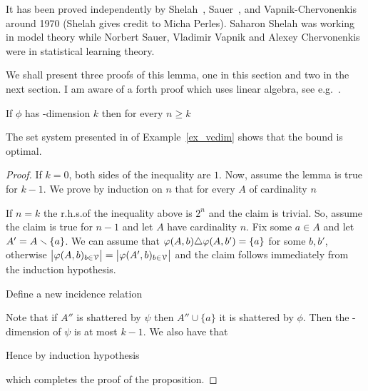 \documentclass[sputnik.tex]{subfiles}
\begin{document}
It has been proved independently by Shelah~\cite{shelah72}, Sauer~\cite{sauer}, and Vapnik-Cher\-vo\-nen\-kis~\cite{VC} around 1970 (Shelah gives credit to Micha Perles).
Saharon Shelah was working in model theory while Norbert Sauer, Vladimir Vapnik and Alexey Chervonenkis were in statistical learning theory.

We shall present three proofs of this lemma, one in this section and two in the next section. I am aware of a forth proof which uses linear algebra, see e.g.~\cite{gowers}. 

\begin{proposition}\label{prop_Sauer}
If $\phi$ has \vc-dimension $k$ then for every $n\ge k$

\end{proposition}

The set system presented in  of Example~\ref{ex_vcdim} shows that the bound is optimal.

\begin{proof}
If $k=0$, both sides of the inequality are $1$.
Now, assume the lemma is true for $k-1$.
We prove by induction on $n$ that for every $A$ of cardinality $n$


If $n=k$ the r.h.s.\@ of the inequality above is $2^n$ and the claim is trivial.
So, assume the claim is true for $n-1$ and let $A$ have cardinality $n$.
Fix some $a\in A$ and let $A'=A\smallsetminus\{a\}$.
We can assume that $\varphi(A,b)\triangle\varphi(A,b')=\{a\}$ for some $b,b'$, otherwise $\big|\varphi(A,b)_{b\in\EuScript V}\big|=\big|\varphi(A',b)_{b\in\EuScript V}\big|$ and the claim follows immediately from the induction hypothesis.

Define a new incidence relation



Note that if $A''$ is shattered by $\psi$ then $A''\cup\{a\}$ it is shattered by $\phi$.
Then the \vc-dimension of $\psi$ is at most $k-1$.
We also have that


Hence by induction hypothesis





which completes the proof of the proposition.
\end{proof}
\end{document}
